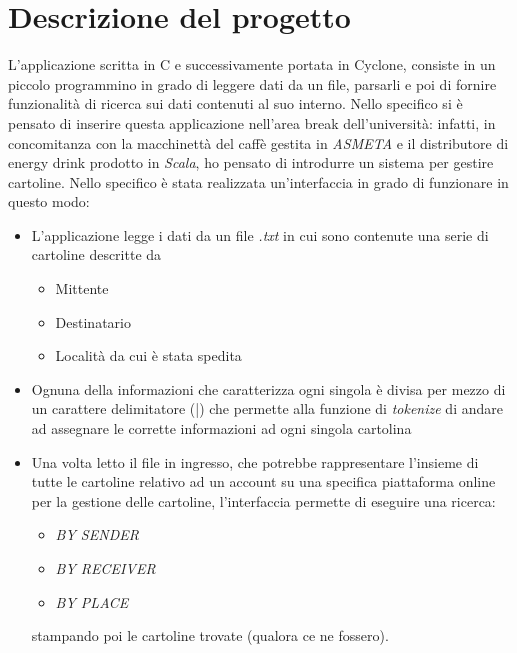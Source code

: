 \section{Descrizione del progetto}
L'applicazione scritta in C e successivamente portata in Cyclone, consiste in un piccolo programmino in grado di leggere dati da un file, parsarli e poi di fornire funzionalità di ricerca sui dati contenuti al suo interno.
Nello specifico si è pensato di inserire questa applicazione nell'area break dell'università: infatti, in concomitanza con la macchinettà del caffè gestita in \textit{ASMETA} e il distributore di energy drink prodotto in \textit{Scala}, ho pensato di introdurre un sistema per gestire cartoline.
Nello specifico è stata realizzata un'interfaccia in grado di funzionare in questo modo:
\begin{itemize}
	\item L'applicazione legge i dati da un file \textit{.txt} in cui sono contenute una serie di cartoline descritte da
	\begin{itemize}
		\item Mittente
		\item Destinatario
		\item Località da cui è stata spedita
	\end{itemize}
	\item Ognuna della informazioni che caratterizza ogni singola è divisa per mezzo di un carattere delimitatore (|) che permette alla funzione di \textit{tokenize} di andare ad assegnare le corrette informazioni ad ogni singola cartolina
	\item Una volta letto il file in ingresso, che potrebbe rappresentare l'insieme di tutte le cartoline relativo ad un account su una specifica piattaforma online per la gestione delle cartoline, l'interfaccia permette di eseguire una ricerca:
	\begin{itemize}
		\item \textit{BY SENDER}
		\item \textit{BY RECEIVER}
		\item \textit{BY PLACE}
	\end{itemize}
	stampando poi le cartoline trovate (qualora ce ne fossero).
\end{itemize}

